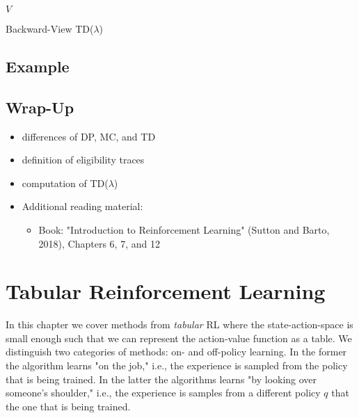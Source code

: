 			\begin{algorithm}  \DontPrintSemicolon
				\Return \(V\) \;
				\caption{Backward-View TD(\(\lambda\))}
				\label{alg:backwardViewTdLambda}
			\end{algorithm}

	\section{Example}

	\section{Wrap-Up}
		\begin{itemize}
			\item differences of \ac{DP}, \ac{MC}, and \ac{TD}
			\item definition of eligibility traces
			\item computation of TD(\(\lambda\))
			\item Additional reading material:
				\begin{itemize}
					\item Book: "Introduction to Reinforcement Learning" (Sutton and Barto, 2018), Chapters 6, 7, and 12  %
				\end{itemize}
		\end{itemize}

\chapter{Tabular Reinforcement Learning}
	In this chapter we cover methods from \emph{tabular} \ac{RL} where the state-action-space is small enough such that we can represent the action-value function as a table. We distinguish two categories of methods: on- and off-policy learning. In the former the algorithm learns "on the job," i.e., the experience is sampled from the policy that is being trained. In the latter the algorithms learns "by looking over someone's shoulder," i.e., the experience is samples from a different policy \(q\) that the one that is being trained.

